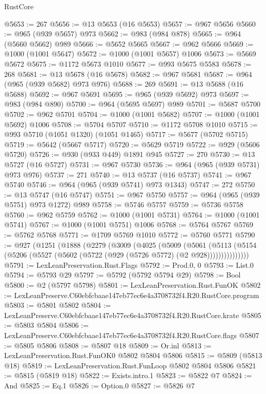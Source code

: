 \begin{lexlean}{RustCore}
\begin{coremodule}
@5653 := 267
@5656 := @13 @5653 (@16 @5653)
@5657 := @967 @5656
@5660 := @965 (@939 @5657) @973
@5662 := @983 (@984 @878)
@5665 := @964 (@5660 @5662) @989
@5666 := @5652 @5665
@5667 := @962 @5666
@5669 := @1000 (@1001 @5647)
@5672 := @1000 (@1001 @5657) @1006
@5673 := @5669 @5672
@5675 := @1172 @5673 @1010
@5677 := @993 @5675 @5583
@5678 := 268
@5681 := @13 @5678 (@16 @5678)
@5682 := @967 @5681
@5687 := @964 (@965 (@939 @5682) @973 @976)
@5688 := 269
@5691 := @13 @5688 (@16 @5688)
@5692 := @967 @5691
@5695 := @965 (@939 @5692) @973
@5697 := @983 (@984 @890)
@5700 := @964 (@5695 @5697) @989
@5701 := @5687 @5700
@5702 := @962 @5701
@5704 := @1000 (@1001 @5682)
@5707 := @1000 (@1001 @5692) @1006
@5708 := @5704 @5707
@5710 := @1172 @5708 @1010
@5715 := @993 @5710 (@1051 @1320) (@1051 @1465)
@5717 := @5677 (@5702 @5715)
@5719 := @5642 (@5667 @5717)
@5720 := @5629 @5719
@5722 := @929 (@5606 @5720)
@5726 := @930 (@933 @449) @1891 @945
@5727 := 270
@5730 := @13 @5727 (@16 @5727)
@5731 := @967 @5730
@5736 := @964 (@965 (@939 @5731) @973 @976)
@5737 := 271
@5740 := @13 @5737 (@16 @5737)
@5741 := @967 @5740
@5746 := @964 (@965 (@939 @5741) @973 @1343)
@5747 := 272
@5750 := @13 @5747 (@16 @5747)
@5751 := @967 @5750
@5757 := @964 (@965 (@939 @5751) @973 @1272) @989
@5758 := @5746 @5757
@5759 := @5736 @5758
@5760 := @962 @5759
@5762 := @1000 (@1001 @5731)
@5764 := @1000 (@1001 @5741)
@5767 := @1000 (@1001 @5751) @1006
@5768 := @5764 @5767
@5769 := @5762 @5768
@5771 := @1709 @5769 @1010
@5772 := @5760 @5771
@5790 := @927
    (@1251
      (@1888
        (@2279
          (@3009
            (@4025
              (@5009
                (@5061
                  (@5113
                    (@5154 (@5206 (@5527 (@5602 (@5722 (@929 (@5726 @5772) (@2 @928)))))))))))))))
@5791 := LexLeanPreservation.Rust.Flags
@5792 := Prod.{0, 0}
@5793 := List.{0}
@5794 := @5793 @29
@5797 := @5792 (@5792 @5794 @29)
@5798 := Bool
@5800 := @2 (@5797 @5798)
@5801 := LexLeanPreservation.Rust.FunOK
@5802 := LexLeanPreserve.C60ebfcbaae147eb77ec6e4a3708732f4.R20.RustCore.program
@5803 := @5801 @5802
@5804 := LexLeanPreserve.C60ebfcbaae147eb77ec6e4a3708732f4.R20.RustCore.krate
@5805 := @5803 @5804
@5806 := LexLeanPreserve.C60ebfcbaae147eb77ec6e4a3708732f4.R20.RustCore.flags
@5807 := @5805 @5806
@5808 := @5807 @18
@5809 := Or.inl
@5813 := LexLeanPreservation.Rust.FunOK0 @5802 @5804 @5806
@5815 := @5809 (@5813 @18)
@5819 := LexLeanPreservation.Rust.FunLoop @5802 @5804 @5806
@5821 := @5815 (@5819 @18)
@5822 := Exists.intro.{1}
@5823 := @5822 @7
@5824 := And
@5825 := Eq.{1}
@5826 := Option.{0}
@5827 := @5826 @7

\end{coremodule}
\end{lexlean}
